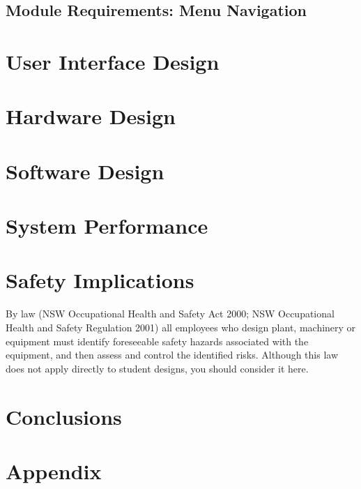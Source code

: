 \documentclass[11pt,a4paper]{article}
\begin{document}
\subsection{Module Requirements: Menu Navigation}







\section{User Interface Design}

\section{Hardware Design}

\section{Software Design}


\section{System Performance}

 
\section{Safety Implications}
By law (NSW Occupational Health and Safety Act 2000; NSW Occupational Health and Safety
Regulation 2001) all employees who design plant, machinery or equipment must identify foreseeable safety hazards associated with the equipment, and then assess and control the identified risks. Although this law does not apply directly to student designs, you should consider it here.



\section{Conclusions}

\newpage




\newpage
\section{Appendix}
\end{document}
